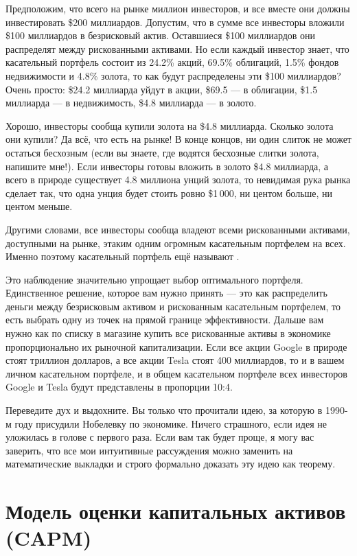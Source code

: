 Предположим, что всего на рынке миллион инвесторов, и все вместе они должны инвестировать \$200 миллиардов. Допустим, что в сумме все инвесторы вложили \$100 миллиардов в безрисковый актив. Оставшиеся \$100 миллиардов они распределят между рискованными активами. Но если каждый инвестор знает, что касательный портфель состоит из 24.2\% акций, 69.5\% облигаций, 1.5\% фондов недвижимости и 4.8\% золота, то как будут распределены эти \$100 миллиардов? Очень просто: \$24.2 миллиарда уйдут в акции, \$69.5 --- в облигации, \$1.5 миллиарда --- в недвижимость, \$4.8 миллиарда --- в золото.

Хорошо, инвесторы сообща купили золота на \$4.8 миллиарда. Сколько золота они купили? Да всё, что есть на рынке! В конце концов, ни один слиток не может остаться бесхозным (если вы знаете, где водятся бесхозные слитки золота, напишите мне!). Если инвесторы готовы вложить в золото \$4.8 миллиарда, а всего в природе существует 4.8 миллиона унций золота, то невидимая рука рынка сделает так, что одна унция будет стоить ровно \$1\,000, ни центом больше, ни центом меньше.

Другими словами, все инвесторы сообща владеют всеми рискованными активами, доступными на рынке, этаким одним огромным касательным портфелем на всех. Именно поэтому касательный портфель ещё называют .

Это наблюдение значительно упрощает выбор оптимального портфеля. Единственное решение, которое вам нужно принять --- это как распределить деньги между безрисковым активом и рискованным касательным портфелем, то есть выбрать одну из точек на прямой границе эффективности. Дальше вам нужно как по списку в магазине купить все рискованные активы в экономике пропорционально их рыночной капитализации. Если все акции Google в природе стоят триллион долларов, а все акции Tesla стоят 400 миллиардов, то и в вашем личном касательном портфеле, и в общем касательном портфеле всех инвесторов Google и Tesla будут представлены в пропорции 10:4.

Переведите дух и выдохните. Вы только что прочитали идею, за которую в 1990-м году  присудили Нобелевку по экономике. Ничего страшного, если идея не уложилась в голове с первого раза. Если вам так будет проще, я могу вас заверить, что все мои интуитивные рассуждения можно заменить на математические выкладки и строго формально доказать эту идею как теорему.

\section{Модель оценки капитальных активов (CAPM)}

